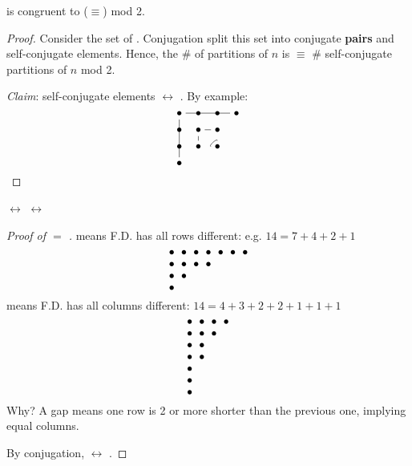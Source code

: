 \documentclass[12pt]{article}
\begin{document}
\begin{theorem}
     is congruent to ($\equiv$)  mod 2.
\end{theorem}
\begin{proof}
    Consider the set of . Conjugation split this set into conjugate \textbf{pairs} and self-conjugate elements. Hence, the \# of partitions of $n$ is $\equiv$ \# self-conjugate partitions of $n$ mod 2. 

    \textit{Claim}: self-conjugate elements $\longleftrightarrow$ . By example: \[\begin{tikzcd}[ampersand replacement=\&,cramped, sep=tiny]
        \bullet \& \bullet \& \bullet \& \bullet \\
        \bullet \& \bullet \& \bullet \\
        \bullet \& \bullet \& \bullet \\
        \bullet
        \arrow[no head, from=1-1, to=1-4]
        \arrow[no head, from=1-1, to=4-1]
        \arrow[no head, from=2-2, to=2-3]
        \arrow[no head, from=2-2, to=3-2]
        \arrow[no head, from=3-3, to=3-3, loop, in=90, out=180, distance=1mm]
    \end{tikzcd}\]
\end{proof}

\begin{theorem}
     $\longleftrightarrow$  $\longleftrightarrow$ 
\end{theorem}
\begin{proof}[Proof of \rt{\#} $=$ \pt{\#}]
     means F.D. has all rows different: e.g. $14=7+4+2+1$ \[\begin{tikzcd}[ampersand replacement=\&,cramped,sep=0pt]
        \bullet \& \bullet \& \bullet \& \bullet \& \bullet \& \bullet \& \bullet \\
        \bullet \& \bullet \& \bullet \& \bullet \\
        \bullet \& \bullet \\
        \bullet
    \end{tikzcd}\]
     means F.D. has all columns different: $14=4+3+2+2+1+1+1$ \[\begin{tikzcd}[ampersand replacement=\&,cramped,sep=0pt]
        \bullet \& \bullet \& \bullet \& \bullet \\
        \bullet \& \bullet \& \bullet \\
        \bullet \& \bullet \\
        \bullet \& \bullet \\
        \bullet \\
        \bullet \\
        \bullet
    \end{tikzcd}\]
    Why? A gap means one row is 2 or more shorter than the previous one, implying equal columns.

    By conjugation,  $\longleftrightarrow$ .
\end{proof}
\end{document}

